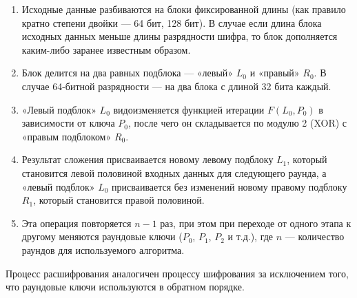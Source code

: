\begin{enumerate}
	\item Исходные данные разбиваются на блоки фиксированной длины (как правило кратно степени двойки — 64 бит, 128 бит). В случае если длина блока исходных данных меньше длины разрядности шифра, то блок дополняется каким-либо заранее известным образом.

	\item Блок делится на два равных подблока — «левый» $L_0$ и «правый» $R_0$. В случае 64-битной разрядности — на два блока с длиной 32 бита каждый.

	\item «Левый подблок» $L_0$ видоизменяется функцией итерации $F(L_0, P_0)$ в зависимости от ключа $P_0$, после чего он складывается по модулю 2 (XOR) с «правым подблоком» $R_0$.

	\item Результат сложения присваивается новому левому подблоку $L_1$, который становится левой половиной входных данных для следующего раунда, а «левый подблок» $L_0$ присваивается без изменений новому правому подблоку $R_1$, который становится правой половиной.

	\item Эта операция повторяется $n-1$ раз, при этом при переходе от одного этапа к другому меняются раундовые ключи ($P_0$, $P_1$, $P_2$ и т.д.), где $n$ — количество раундов для используемого алгоритма.
\end{enumerate}

Процесс расшифрования аналогичен процессу шифрования за исключением того, что раундовые ключи используются в обратном порядке.
